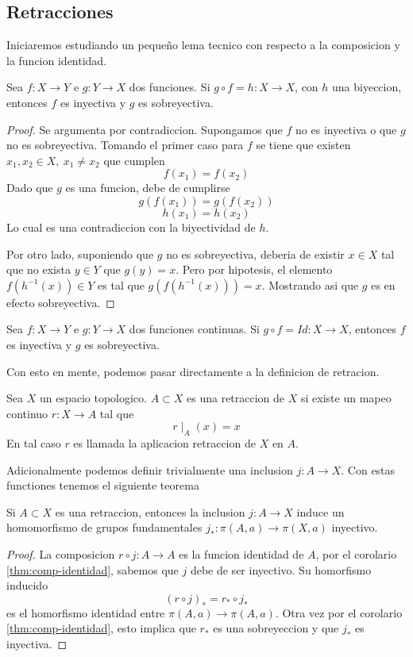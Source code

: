 \subsection{Retracciones}
Iniciaremos estudiando un pequeño lema tecnico con respecto a la
composicion y la funcion identidad.
\begin{lema}
  Sea \(f : X \to Y\) e \(g : Y \to X\) dos funciones. Si \( g \circ f =
  h : X \to X \), con \(h\) una biyeccion, entonces \(f\) es inyectiva y
  \(g\) es sobreyectiva.
\end{lema}
\begin{proof}
  Se argumenta por contradiccion. Supongamos que \(f\) no es inyectiva o
  que \(g\) no es sobreyectiva. Tomando el primer caso para \(f\) se
  tiene que existen \(x_1 , x_2 \in X,\ x_1 \neq x_2\) que cumplen
  \[ f (x_1) = f(x_2) \]
  Dado que \(g\) es una funcion, debe de cumplirse
  \[ g (f (x_1)) = g (f(x_2)) \]
  \[ h (x_1) = h(x_2) \]
  Lo cual es una contradiccion con la biyectividad de \(h\).

  Por otro lado, suponiendo que \(g\) no es sobreyectiva, deberia de
  existir \(x \in X\) tal que no exista \( y \in Y\) que \(g (y) = x\).
  Pero por hipotesis, el elemento \(f(h^{-1}(x)) \in Y\) es tal que \(g
  (f (h^{-1}(x))) = x\). Mostrando asi que \(g\) es en efecto
  sobreyectiva.
\end{proof}
\begin{corolario} \label{thm:comp-identidad}
  Sea \(f : X \to Y\) e \(g : Y \to X\) dos funciones continuas. Si \( g
  \circ f = Id : X \to X \), entonces \(f\) es inyectiva y \(g\) es
sobreyectiva.
\end{corolario}
\noindent Con esto en mente, podemos pasar directamente a la definicion
de retracion.
\begin{definicion}
  Sea \(X\) un espacio topologico. \(A \subset X\) es una retraccion de
  \(X\) si existe un mapeo continuo \(r : X \to A\) tal que
  \[ r \mid_{A} (x) = x \]
  En tal caso \(r\) es llamada la aplicacion retraccion de \(X\) en \(A\).
\end{definicion}
Adicionalmente podemos definir trivialmente una inclusion \(j : A \to
X\). Con estas functiones tenemos el siguiente teorema
\begin{teorema}
Si \(A \subset X\) es una retraccion, entonces la inclusion \(j : A \to
X\) induce un homomorfismo de grupos fundamentales \(j_{*} : \pi(A, a)
\to \pi(X,a)\) inyectivo.
\end{teorema}
\begin{proof}
  La composicion \(r \circ j : A \to A\) es la funcion identidad de
  \(A\), por el corolario \ref{thm:comp-identidad}, sabemos que \(j\)
  debe de ser inyectivo. Su homorfismo inducido
  \[ (r \circ j)_{*} = r_{*} \circ j_{*} \]
  es el homorfismo identidad entre \(\pi(A,a) \to \pi(A,a)\). Otra vez
  por el corolario \ref{thm:comp-identidad}, esto implica que \(r_{*}\)
  es una sobreyeccion y que \(j_{*}\) es inyectiva.
\end{proof}
